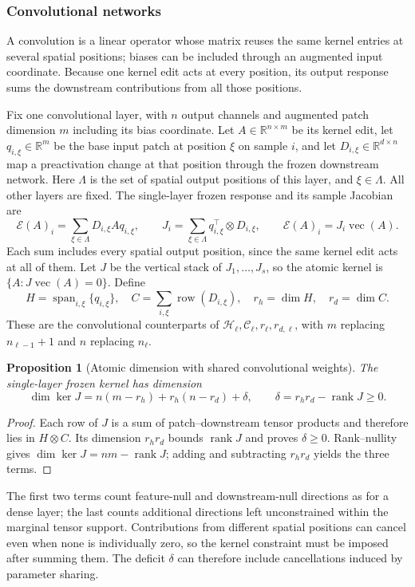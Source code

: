 \documentclass[twoside]{article}
\newtheorem{proposition}[theorem]{Proposition}
\theoremstyle{remark}
\DeclareMathOperator{\rank}{rank}
\DeclareMathOperator{\spanop}{span}
\newcommand{\R}{\mathbb R}
\theoremstyle{highlightdefinition}
\theoremstyle{remark}
\newcommand{\spn}{\spanop}
\begin{document}
\subsubsection{Convolutional networks}\label{app:cnn-theory}
A convolution is a linear operator whose matrix reuses the same kernel entries at several spatial positions; biases can be included through an augmented input coordinate. Because one kernel edit acts at every position, its output response sums the downstream contributions from all those positions.

Fix one convolutional layer, with $n$ output channels and augmented patch dimension $m$ including its bias coordinate. Let $A\in\R^{n\times m}$ be its kernel edit, let $q_{i,\xi}\in\R^m$ be the base input patch at position $\xi$ on sample $i$, and let $D_{i,\xi}\in\R^{d\times n}$ map a preactivation change at that position through the frozen downstream network. Here $\Lambda$ is the set of spatial output positions of this layer, and $\xi\in\Lambda$. All other layers are fixed. The single-layer frozen response and its sample Jacobian are
\[
 \mathcal E(A)_i=\sum_{\xi\in\Lambda} D_{i,\xi}Aq_{i,\xi},\qquad
 J_i=\sum_{\xi\in\Lambda} q_{i,\xi}^\top\otimes D_{i,\xi},
 \qquad \mathcal E(A)_i=J_i\operatorname{vec}(A).
\]
Each sum includes every spatial output position, since the same kernel edit acts at all of them. Let $J$ be the vertical stack of $J_1,\ldots,J_s$, so the atomic kernel is $\{A:J\operatorname{vec}(A)=0\}$. Define
\[
 H=\spn_{i,\xi}\{q_{i,\xi}\},\quad
 C=\sum_{i,\xi}\operatorname{row}(D_{i,\xi}),\quad
 r_h=\dim H,\quad r_d=\dim C.
\]
These are the convolutional counterparts of $\mathcal H_\ell,\mathcal C_\ell,r_\ell,r_{d,\ell}$, with $m$ replacing $n_{\ell-1}+1$ and $n$ replacing $n_\ell$. 
\begin{proposition}[Atomic dimension with shared convolutional weights]
The single-layer frozen kernel has dimension
\[
 \dim\ker J=n(m-r_h)+r_h(n-r_d)+\delta,
 \qquad \delta=r_hr_d-\rank J\ge0.
\]
\end{proposition}
\begin{proof}
Each row of $J$ is a sum of patch--downstream tensor products and therefore lies in $H\otimes C$. Its dimension $r_hr_d$ bounds $\rank J$ and proves $\delta\ge0$. Rank--nullity gives $\dim\ker J=nm-\rank J$; adding and subtracting $r_hr_d$ yields the three terms.
\end{proof}
The first two terms count feature-null and downstream-null directions as for a dense layer; the last counts additional directions left unconstrained within the marginal tensor support. Contributions from different spatial positions can cancel even when none is individually zero, so the kernel constraint must be imposed after summing them. The deficit $\delta$ can therefore include cancellations induced by parameter sharing.
\end{document}
